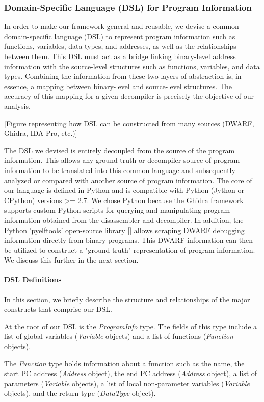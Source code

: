 \documentclass[conference]{IEEEtran}
\begin{document}
\subsubsection{Domain-Specific Language (DSL) for Program Information}

In order to make our framework general and reusable, we devise a common domain-specific language (DSL) to represent program information such as functions, variables, data types, and addresses, as well as the relationships between them. This DSL must act as a bridge linking binary-level address information with the source-level structures such as functions, variables, and data types. Combining the information from these two layers of abstraction is, in essence, a mapping between binary-level and source-level structures. The accuracy of this mapping for a given decompiler is precisely the objective of our analysis.

[Figure representing how DSL can be constructed from many sources (DWARF, Ghidra, IDA Pro, etc.)]

The DSL we devised is entirely decoupled from the source of the program information. This allows any ground truth or decompiler source of program information to be translated into this common language and subsequently analyzed or compared with another source of program information. The core of our language is defined in Python and is compatible with Python (Jython or CPython) versions >= 2.7. We chose Python because the Ghidra framework supports custom Python scripts for querying and manipulating program information obtained from the disassembler and decompiler. In addition, the Python 'pyelftools' open-source library [] allows scraping DWARF debugging information directly from binary programs. This DWARF information can then be utilized to construct a "ground truth" representation of program information. We discuss this further in the next section.

\paragraph{DSL Definitions}

In this section, we briefly describe the structure and relationships of the major constructs that comprise our DSL.

At the root of our DSL is the \emph{ProgramInfo} type. The fields of this type include a list of global variables (\emph{Variable} objects) and a list of functions (\emph{Function} objects).

The \emph{Function} type holds information about a function such as the name, the start PC address (\emph{Address} object), the end PC address (\emph{Address} object), a list of parameters (\emph{Variable} objects), a list of local non-parameter variables (\emph{Variable} objects), and the return type (\emph{DataType} object).
\end{document}
